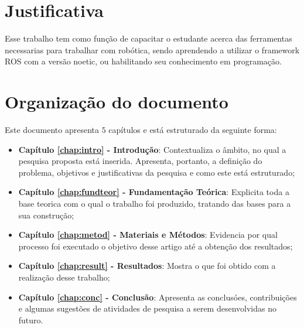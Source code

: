\section{Justificativa}
\label{sec:justi}

Esse trabalho tem como função de capacitar o estudante acerca das ferramentas necessarias para trabalhar com robótica, sendo aprendendo a utilizar o framework ROS com a versão noetic, ou habilitando seu conhecimento em programação.

\section{Organização do documento}
\label{section:organizacao}

Este documento apresenta $5$ capítulos e está estruturado da seguinte forma:

\begin{itemize}

  \item \textbf{Capítulo \ref{chap:intro} - Introdução}: Contextualiza o âmbito, no qual a pesquisa proposta está inserida. Apresenta, portanto, a definição do problema, objetivos e justificativas da pesquisa e como este \thetypeworkthree está estruturado;
  \item \textbf{Capítulo \ref{chap:fundteor} - Fundamentação Teórica}: Explicita toda a base teorica com o qual o trabalho foi produzido, tratando das bases para a sua construção;
  \item \textbf{Capítulo \ref{chap:metod} - Materiais e Métodos}: Evidencia por qual processo foi executado o objetivo desse artigo até a obtenção dos resultados;
  \item \textbf{Capítulo \ref{chap:result} - Resultados}: Mostra o que foi obtido com a realização desse trabalho;
  \item \textbf{Capítulo \ref{chap:conc} - Conclusão}: Apresenta as conclusóes, contribuições e algumas sugestões de atividades de pesquisa a serem desenvolvidas no futuro.

\end{itemize}
